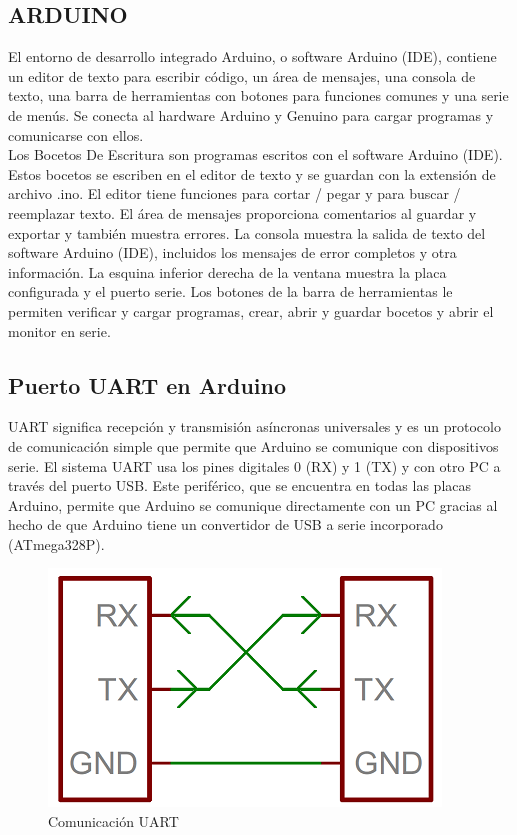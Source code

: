 \documentclass[12pt]{book}
\begin{document}
\subsection{ARDUINO}
El entorno de desarrollo integrado Arduino, o software Arduino (IDE), contiene un editor de texto para escribir código, un área de mensajes, una consola de texto, una barra de herramientas con botones para funciones comunes y una serie de menús. Se conecta al hardware Arduino y Genuino para cargar programas y comunicarse con ellos. \\
Los Bocetos De Escritura son programas escritos con el software Arduino (IDE). Estos bocetos se escriben en el editor de texto y se guardan con la extensión de archivo .ino. El editor tiene funciones para cortar / pegar y para buscar / reemplazar texto. El área de mensajes proporciona comentarios al guardar y exportar y también muestra errores. La consola muestra la salida de texto del software Arduino (IDE), incluidos los mensajes de error completos y otra información. La esquina inferior derecha de la ventana muestra la placa configurada y el puerto serie. Los botones de la barra de herramientas le permiten verificar y cargar programas, crear, abrir y guardar bocetos y abrir el monitor en serie.

\subsection{Puerto UART en Arduino}
UART significa recepción y transmisión asíncronas universales y es un protocolo de comunicación simple que permite que Arduino se comunique con dispositivos serie. El sistema UART usa los pines digitales 0 (RX) y 1 (TX) y con otro PC a través del puerto USB. Este periférico, que se encuentra en todas las placas Arduino, permite que Arduino se comunique directamente con un PC gracias al hecho de que Arduino tiene un convertidor de USB a serie incorporado (ATmega328P).

\begin{figure}[h]
	\centering
	\includegraphics[width=0.5\linewidth]{imagenes/Uart}
	\caption{Comunicación UART}
	\label{fig:Comunicación UART}
\end{figure}
\end{document}
